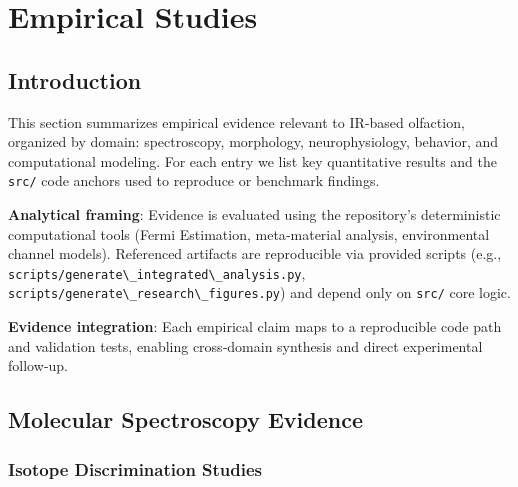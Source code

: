 \documentclass[
  13pt,
  a4paperpaper,
  12pt]{article}
\author{}
\date{}
\newcommand{\passthrough}[1]{#1}
\let\oldsection\section
\renewcommand{\section}{\clearpage\oldsection}
\begin{document}
{
\hypersetup{linkcolor=black}
\setcounter{tocdepth}{3}
\tableofcontents
}
\section{Empirical Studies}\label{sec:empirical_studies}

\subsection{Introduction}\label{introduction}

This section summarizes empirical evidence relevant to IR‑based
olfaction, organized by domain: spectroscopy, morphology,
neurophysiology, behavior, and computational modeling. For each entry we
list key quantitative results and the \passthrough{\lstinline!src/!}
code anchors used to reproduce or benchmark findings.

\textbf{Analytical framing}: Evidence is evaluated using the
repository's deterministic computational tools (Fermi Estimation,
meta‑material analysis, environmental channel models). Referenced
artifacts are reproducible via provided scripts (e.g.,
\passthrough{\lstinline!scripts/generate\_integrated\_analysis.py!},
\passthrough{\lstinline!scripts/generate\_research\_figures.py!}) and
depend only on \passthrough{\lstinline!src/!} core logic.

\textbf{Evidence integration}: Each empirical claim maps to a
reproducible code path and validation tests, enabling cross‑domain
synthesis and direct experimental follow‑up.

\subsection{Molecular Spectroscopy
Evidence}\label{molecular-spectroscopy-evidence}

\subsubsection{Isotope Discrimination
Studies}\label{isotope-discrimination-studies}
\end{document}
